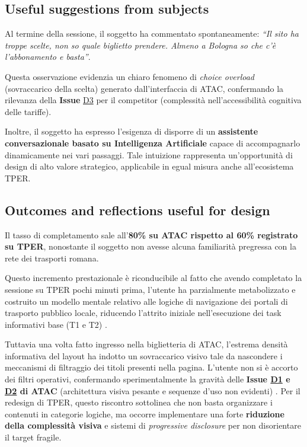 \documentclass[11pt,a4paper]{article}
\begin{document}
\subsection*{Useful suggestions from subjects}
\begin{tcolorbox}[colback=backgroundColor,colframe=borderColor,arc=2mm]
Al termine della sessione, il soggetto ha commentato spontaneamente: \textit{``Il sito ha troppe scelte, non so quale biglietto prendere. Almeno a Bologna so che c'è l'abbonamento e basta''}. 

Questa osservazione evidenzia un chiaro fenomeno di \textit{choice overload} (sovraccarico della scelta) generato dall'interfaccia di ATAC, confermando la rilevanza della \textbf{Issue} \hyperref[atac:D3]{D3} per il competitor (complessità nell'accessibilità cognitiva delle tariffe).

Inoltre, il soggetto ha espresso l'esigenza di disporre di un \textbf{assistente conversazionale basato su Intelligenza Artificiale} capace di accompagnarlo dinamicamente nei vari passaggi. Tale intuizione rappresenta un'opportunità di design di alto valore strategico, applicabile in egual misura anche all'ecosistema TPER.
\end{tcolorbox}

\subsection*{Outcomes and reflections useful for design}
\begin{tcolorbox}[colback=backgroundColor,colframe=borderColor,arc=2mm]
Il tasso di completamento sale all'\textbf{80\% su ATAC rispetto al 60\% registrato su TPER}, nonostante il soggetto non avesse alcuna familiarità pregressa con la rete dei trasporti romana.

Questo incremento prestazionale è riconducibile al fatto che avendo completato la sessione su TPER pochi minuti prima, l'utente ha parzialmente metabolizzato e costruito un modello mentale relativo alle logiche di navigazione dei portali di trasporto pubblico locale, riducendo l'attrito iniziale nell'esecuzione dei task informativi base (T1 e T2) .

Tuttavia una volta fatto ingresso nella biglietteria di ATAC, l'estrema densità informativa del layout ha indotto un sovraccarico visivo tale da nascondere i meccanismi di filtraggio dei titoli presenti nella pagina. L'utente non si è accorto dei filtri operativi, confermando sperimentalmente la gravità delle \textbf{Issue \hyperref[atac:D1]{D1} e \hyperref[atac:D2]{D2} di ATAC} (architettura visiva pesante e sequenze d'uso non evidenti) . Per il redesign di TPER, questo riscontro sottolinea che non basta organizzare i contenuti in categorie logiche, ma occorre implementare una forte \textbf{riduzione della complessità visiva} e sistemi di \textit{progressive disclosure} per non disorientare il target fragile.
\end{tcolorbox}
\end{document}
